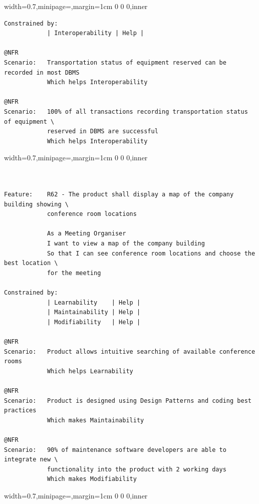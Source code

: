 \documentclass[dissertation,final]{softeng}
\newenvironment{featurecode}[1]
{ \lrbox\featurebox \begin{adjustbox}{width=#1\textwidth,minipage=\textwidth,margin=1cm 0 0 0,inner} }
{ \end{adjustbox}\endlrbox}
\newenvironment{featurelist}[2]
{
\newcommand{\setcaption}{\caption{#1}}
\newcommand{\setlabel}{\label{#2}}
}
{\begin{listing}[h!]\centering\usebox\featurebox\setcaption\setlabel\end{listing}}
\begin{document}
\begin{appendices}
\begin{featurelist}{R61 -- The product shall record the transportation status of equipment reserved}{lst:feature_r61}
\begin{featurecode}{0.7}
\begin{verbatim}
Constrained by:
            | Interoperability | Help |

@NFR	
Scenario:   Transportation status of equipment reserved can be recorded in most DBMS
            Which helps Interoperability

@NFR	
Scenario:   100% of all transactions recording transportation status of equipment \
            reserved in DBMS are successful
            Which helps Interoperability
\end{verbatim}
\end{featurecode}
\end{featurelist}
\clearpage

\begin{featurelist}{R62 -- The product shall display a map of the company building}{lst:feature_r62}
\begin{featurecode}{0.7}
\begin{verbatim}


Feature:    R62 - The product shall display a map of the company building showing \
            conference room locations

            As a Meeting Organiser
            I want to view a map of the company building
            So that I can see conference room locations and choose the best location \
            for the meeting
	
Constrained by:
            | Learnability    | Help |
            | Maintainability | Help |
            | Modifiability   | Help |

@NFR	
Scenario:   Product allows intuitive searching of available conference rooms
            Which helps Learnability
	
@NFR
Scenario:   Product is designed using Design Patterns and coding best practices
            Which makes Maintainability

@NFR
Scenario:   90% of maintenance software developers are able to integrate new \
            functionality into the product with 2 working days
            Which makes Modifiability
\end{verbatim}
\end{featurecode}
\end{featurelist}

\begin{featurelist}{R64 -- The product shall send a meeting confirmation to the meeting organizer}{lst:feature_r64}
\begin{featurecode}{0.7}
\begin{verbatim}



\end{verbatim}
\end{featurecode}
\end{featurelist}
\end{appendices}
\end{document}
